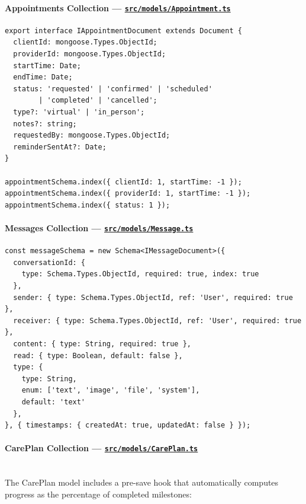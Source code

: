 \documentclass[12pt,letterpaper]{article}
\newcommand{\ghrepo}{https://github.com/omniV1/lunaraCare}
\begin{document}
\paragraph{Appointments Collection --- \href{\ghrepo/blob/main/backend/src/models/Appointment.ts}{\texttt{src/models/Appointment.ts}}}

\begin{lstlisting}[caption={Appointment model (\texttt{Appointment.ts})}]
export interface IAppointmentDocument extends Document {
  clientId: mongoose.Types.ObjectId;
  providerId: mongoose.Types.ObjectId;
  startTime: Date;
  endTime: Date;
  status: 'requested' | 'confirmed' | 'scheduled'
        | 'completed' | 'cancelled';
  type?: 'virtual' | 'in_person';
  notes?: string;
  requestedBy: mongoose.Types.ObjectId;
  reminderSentAt?: Date;
}

appointmentSchema.index({ clientId: 1, startTime: -1 });
appointmentSchema.index({ providerId: 1, startTime: -1 });
appointmentSchema.index({ status: 1 });
\end{lstlisting}

\paragraph{Messages Collection --- \href{\ghrepo/blob/main/backend/src/models/Message.ts}{\texttt{src/models/Message.ts}}}

\begin{lstlisting}[caption={Message model (\texttt{Message.ts})}]
const messageSchema = new Schema<IMessageDocument>({
  conversationId: {
    type: Schema.Types.ObjectId, required: true, index: true
  },
  sender: { type: Schema.Types.ObjectId, ref: 'User', required: true },
  receiver: { type: Schema.Types.ObjectId, ref: 'User', required: true },
  content: { type: String, required: true },
  read: { type: Boolean, default: false },
  type: {
    type: String,
    enum: ['text', 'image', 'file', 'system'],
    default: 'text'
  },
}, { timestamps: { createdAt: true, updatedAt: false } });
\end{lstlisting}

\paragraph{CarePlan Collection --- \href{\ghrepo/blob/main/backend/src/models/CarePlan.ts}{\texttt{src/models/CarePlan.ts}}}
\mbox{}\\
The CarePlan model includes a pre-save hook that automatically computes progress as the percentage of completed milestones:
\end{document}
